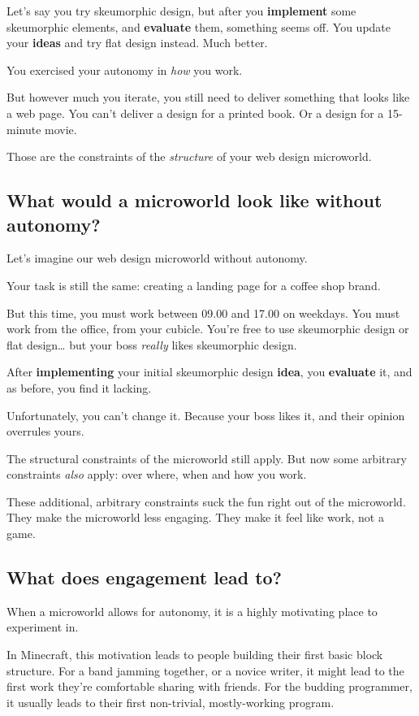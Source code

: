 Let's say you try skeumorphic design, but after you \textbf{implement}
some skeumorphic elements, and \textbf{evaluate} them, something seems
off. You update your \textbf{ideas} and try flat design instead. Much
better.

You exercised your autonomy in \emph{how} you work.

But however much you iterate, you still need to deliver something that
looks like a web page. You can't deliver a design for a printed book. Or
a design for a 15-minute movie.

Those are the constraints of the \emph{structure} of your web design
microworld.

\subsection{What would a microworld look like without autonomy?}

Let's imagine our web design microworld without autonomy.

Your task is still the same: creating a landing page for a coffee shop
brand.

But this time, you must work between 09.00 and 17.00 on weekdays. You
must work from the office, from your cubicle. You're free to use
skeumorphic design or flat design\ldots{} but your boss \emph{really}
likes skeumorphic design.

After \textbf{implementing} your initial skeumorphic design
\textbf{idea}, you \textbf{evaluate} it, and as before, you find it
lacking.

Unfortunately, you can't change it. Because your boss likes it, and
their opinion overrules yours.

The structural constraints of the microworld still apply. But now some
arbitrary constraints \emph{also} apply: over where, when and how you
work.

These additional, arbitrary constraints suck the fun right out of the
microworld. They make the microworld less engaging. They make it feel
like work, not a game.

\subsection{What does engagement lead to?}

When a microworld allows for autonomy, it is a highly motivating place
to experiment in.

In Minecraft, this motivation leads to people building their first basic
block structure. For a band jamming together, or a novice writer, it
might lead to the first work they're comfortable sharing with friends.
For the budding programmer, it usually leads to their first non-trivial,
mostly-working program.

